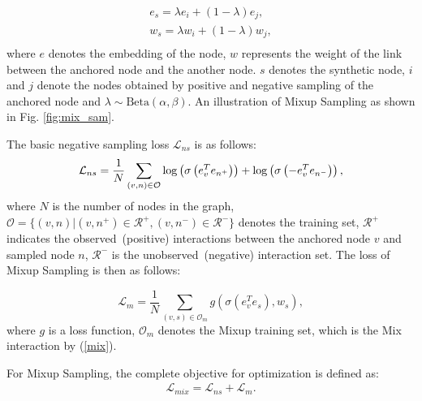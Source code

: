 \begin{equation}\label{mix}
\begin{array}{c}
e_{s} = \lambda e_{i}+(1-\lambda) e_{j}, \\
w_{s} = \lambda w_{i}+(1-\lambda)w_{j}, \\
\end{array}
\end{equation}
where $e$ denotes the embedding of the node, $w$ represents the weight of the link between the anchored node and the another node. $s$ denotes the synthetic node, $i$ and $j$ denote the nodes obtained by positive and negative sampling of the anchored node and $\lambda \sim \text{Beta}(\alpha, \beta)$. An illustration of Mixup Sampling as shown in Fig. \ref{fig:mix_sam}. 


The basic negative sampling loss $\mathcal{L}_{ns}$ is as follows:
\begin{equation}
\small
\mathcal{L}_{ns}=\frac{1}{N}\sum_{(v,n) \in\mathcal{O}} \log\left(\sigma\left ( e_v^T e_{n^+} \right )\right ) + \log\left(\sigma\left (-e_v^T e_{n^-}\right )\right ),
\end{equation}
where $N$ is the number of nodes in the graph, $ \mathcal{O} =\{(v,n) | (v,n^{+})\in \mathcal{R^{+}}, (v,n^{-})\in \mathcal{R^{-}}\} $ denotes the training set, \(\mathcal{R^{+}}\) indicates the observed~(positive) interactions between the anchored node $v$ and sampled node $n$, \(\mathcal{R^{-}}\) is the unobserved~(negative) interaction set. The loss of Mixup Sampling is then as follows:

\begin{equation}
\mathcal{L}_{m}=\frac{1}{N}\sum_{(v,s) \in\mathcal{O}_m} g\left(\sigma\left(e_v^T e_{s}\right), w_s\right),
\end{equation}
where $g$ is a loss function, $ \mathcal{O}_m$ denotes the Mixup training set,  which is the Mix interaction by (\ref{mix}).

For Mixup Sampling, the complete objective for optimization is defined as:
\begin{equation}
\begin{array}{c}

\mathcal{L}_{mix}=\mathcal{L}_{ns}+ \mathcal{L}_{m}.

\end{array}
\end{equation}





